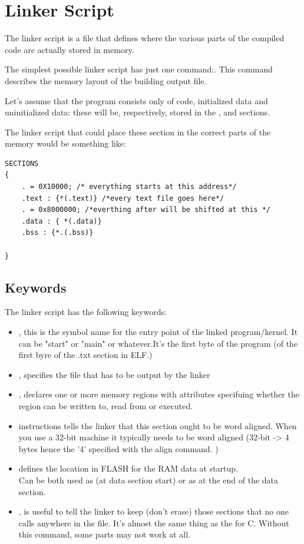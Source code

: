 \section{Linker Script}
The linker script is a file that defines where the various parts of the compiled code are actually stored in memory.

The simplest possible linker script has just one command:\code[SECTIONS]. This command describes the memory layout of the building output file.

Let's assume that the program consists only of code, initialized data and uninitialized data: these will be, respectively, stored in the ,  and  sections.

The linker script that could place these section in the correct parts of the memory would be something like:

\begin{lstlisting}
SECTIONS
{
	. = 0X10000; /* everything starts at this address*/
	.text : {*(.text)} /*every text file goes here*/ 
	. = 0x8000000; /*everthing after will be shifted at this */
	.data : { *(.data)}
	.bss : {*.(.bss)}

}

\end{lstlisting}

\subsection{Keywords}
The linker script has the following keywords:
\begin{itemize}
	\item {}, this is the symbol name for the entry point of the linked program/kernel. It can be "start" or "main" or whatever.It's the first byte of the program (of the first byre of the .txt section in ELF.)
	\item {}, specifies the file that has to be output by the linker
	\item {}, declares one or more memory regions with attributes specifuing whether the region can be written to, read from or executed.
	\item {} instructions tells the linker that this section ought to be word aligned. When you use a 32-bit machine it typically needs to be word aligned (32-bit -> 4 bytes hence the '4' specified with the align command. )
	\item {} defines the location in FLASH for the RAM data at startup. \\ Can be both used as  (at data section start) or as  at the end of the data section.
	\item {}, is useful to tell the linker to keep (don't erase) those sections that no one calls anywhere in the  file. It's almost the same thing as the  for C. Without this command, some parts may not work at all.
\end{itemize}

